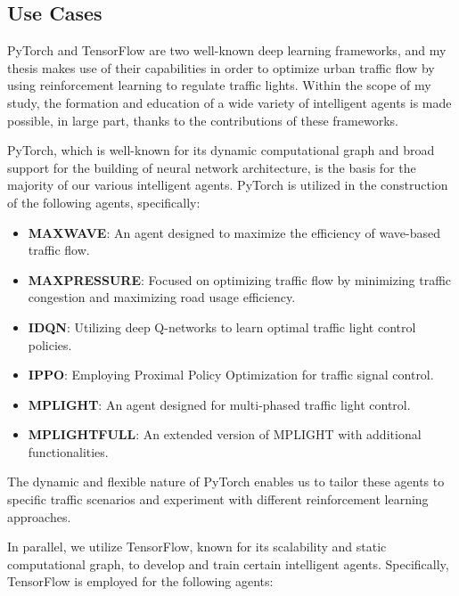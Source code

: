 \subsection{Use Cases}
PyTorch and TensorFlow are two well-known deep learning frameworks, and my thesis makes use of their capabilities in order to optimize urban traffic flow by using reinforcement learning to regulate traffic lights. Within the scope of my study, the formation and education of a wide variety of intelligent agents is made possible, in large part, thanks to the contributions of these frameworks.

PyTorch, which is well-known for its dynamic computational graph and broad support for the building of neural network architecture, is the basis for the majority of our various intelligent agents. PyTorch is utilized in the construction of the following agents, specifically:

\begin{itemize}
    \item \textbf{MAXWAVE}: An agent designed to maximize the efficiency of wave-based traffic flow.
    
    \item \textbf{MAXPRESSURE}: Focused on optimizing traffic flow by minimizing traffic congestion and maximizing road usage efficiency.
    
    \item \textbf{IDQN}: Utilizing deep Q-networks to learn optimal traffic light control policies.
    
    \item \textbf{IPPO}: Employing Proximal Policy Optimization for traffic signal control.
    
    \item \textbf{MPLIGHT}: An agent designed for multi-phased traffic light control.
    
    \item \textbf{MPLIGHTFULL}: An extended version of MPLIGHT with additional functionalities.
\end{itemize}

The dynamic and flexible nature of PyTorch enables us to tailor these agents to specific traffic scenarios and experiment with different reinforcement learning approaches.

In parallel, we utilize TensorFlow, known for its scalability and static computational graph, to develop and train certain intelligent agents. Specifically, TensorFlow is employed for the following agents:

